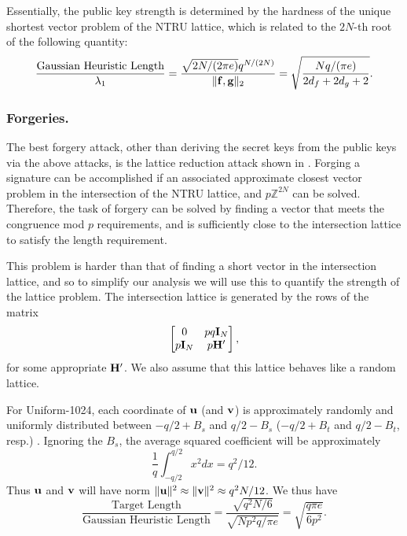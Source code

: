 \documentclass{llncs}
\newcommand{\ZZ}{\mathbb{Z}}
\newcommand{\bff}{{\bf f}}
\newcommand{\bfg}{{\bf g}}
\newcommand{\bfu}{{\bf u}}
\newcommand{\bfv}{{\bf v}}
\newcommand{\bfH}{{\bf H}}
\newcommand{\bfI}{{\bf I}}
\newcommand{\<}{\langle}
\renewcommand{\>}{\rangle}
\begin{document}
Essentially, the public key strength is determined by the hardness of the unique 
shortest vector
problem of the NTRU lattice,
which is related to the $2N$-th root of the following quantity:
\[
\frac{\text{Gaussian Heuristic Length}}{\lambda_1}=
\frac{\sqrt{2N/(2\pi e)}q^{N/(2N)}}{\|\bff,\bfg\|_2} = 
\sqrt{\frac{Nq/(\pi e)}{2d_f+2d_g+2}}.
\]

\subsubsection{Forgeries.} The best forgery attack, other than 
deriving the secret keys from the public keys via the above 
attacks, is 
the lattice reduction attack
shown in \cite{DBLP:conf/pqcrypto/HoffsteinPSSW14}.   Forging a signature can be accomplished if an associated approximate closest vector problem in the intersection of the NTRU lattice, and $p\ZZ^{2N}$ can be solved.  
Therefore, the task of forgery can be solved by finding a vector that meets the congruence mod $p$ requirements, and is sufficiently close to the intersection lattice to satisfy the length requirement.

This problem is harder than that of finding a short vector in the intersection lattice, and so to simplify our analysis we will use this to quantify the strength of the lattice problem.
The intersection lattice is generated by the rows of the matrix
$$
\begin{bmatrix}
0& pq\bfI_N \\
p \bfI_N&p \bfH' \\
\end{bmatrix},
$$
for some appropriate $\bfH'$.
We also assume that this lattice behaves like a random lattice.

For {\sf Uniform-1024}, each coordinate of $\bfu$ (and $\bfv$) is approximately randomly and uniformly distributed between $-q/2+B_s$ and $q/2-B_s$ ($-q/2+B_t$ and $q/2-B_t$, resp.) . %
Ignoring the $B_s$, the average squared coefficient will be approximately
$$
\frac{1}{q}\int_{-q/2}^{q/2}x^2 dx =q^2/12.
$$
Thus $\bfu$ and $\bfv$ will have norm $\|\bfu\|^2\approx \|\bfv\|^2 \approx q^2N/12$.    
We thus have 
$$
\frac{\text{Target Length}}{\text{Gaussian Heuristic Length}}
 = \frac{\sqrt{q^2N/6}}{\sqrt{Np^2q/\pi e}} = \sqrt{
 \frac{q\pi e}{6p^2}}.
$$
\end{document}
